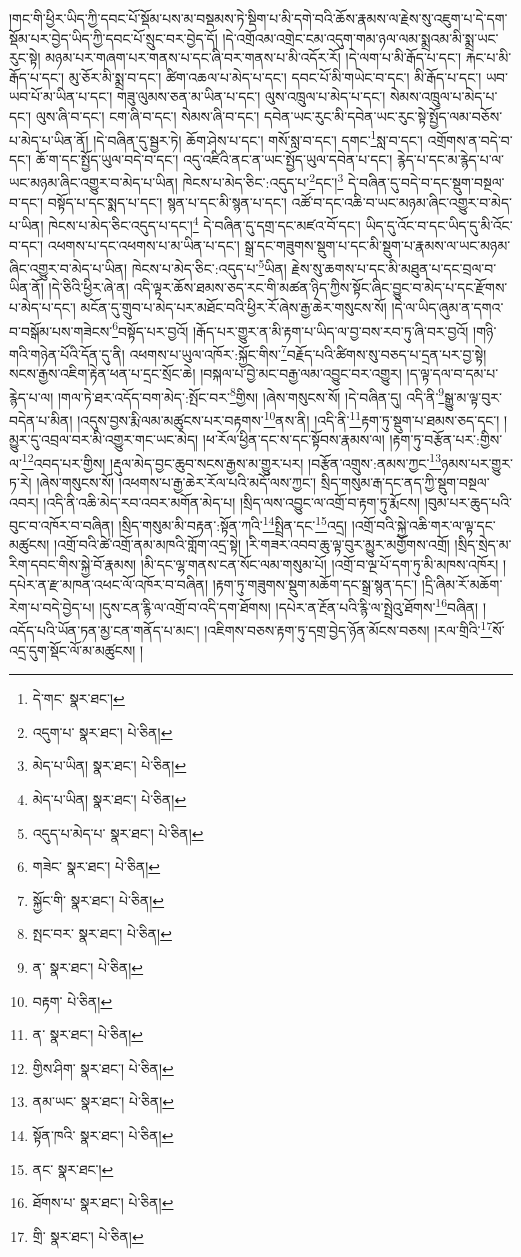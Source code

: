 །གང་གི་ཕྱིར་ཡིད་ཀྱི་དབང་པོ་སྡོམ་པས་མ་བསྡམས་ཏེ་སྡིག་པ་མི་དགེ་བའི་ཆོས་རྣམས་ལ་རྗེས་སུ་འཇུག་པ་དེ་དག་སྡོམ་པར་བྱེད་ཡིད་ཀྱི་དབང་པོ་སྲུང་བར་བྱེད་དོ། །དེ་འགྲོའམ་འགྲེང་ངམ་འདུག་གམ་ཉལ་ལམ་སྨྲའམ་མི་སྨྲ་ཡང་རུང་སྟེ། མཉམ་པར་གཞག་པར་གནས་པ་དང་ཞི་བར་གནས་པ་མི་འདོར་རོ། །དེ་ལག་པ་མི་རྒོད་པ་དང་། རྐང་པ་མི་རྒོད་པ་དང་། མུ་ཅོར་མི་སྨྲ་བ་དང་། ཚིག་འཆལ་པ་མེད་པ་དང་། དབང་པོ་མི་གཡེང་བ་དང་། མི་རྒོད་པ་དང་། ཡབ་ཡབ་པོ་མ་ཡིན་པ་དང་། གཟུ་ལུམས་ཅན་མ་ཡིན་པ་དང་། ལུས་འཁྲུལ་པ་མེད་པ་དང་། སེམས་འཁྲུལ་པ་མེད་པ་དང་། ལུས་ཞི་བ་དང་། ངག་ཞི་བ་དང་། སེམས་ཞི་བ་དང་། དབེན་ཡང་རུང་མི་དབེན་ཡང་རུང་སྟེ་སྤྱོད་ལམ་བཅོས་པ་མེད་པ་ཡིན་ནོ། །དེ་བཞིན་དུ་སྦྱར་ཏེ། ཆོག་ཤེས་པ་དང་། གསོ་སླ་བ་དང་། དགང་\footnote{དེ་གང་  སྣར་ཐང་། }སླ་བ་དང་། འགྲོགས་ན་བདེ་བ་དང་། ཆོ་ག་དང་སྤྱོད་ཡུལ་བདེ་བ་དང་། འདུ་འཛིའི་ནང་ན་ཡང་སྤྱོད་ཡུལ་དབེན་པ་དང་། རྙེད་པ་དང་མ་རྙེད་པ་ལ་ཡང་མཉམ་ཞིང་འགྱུར་བ་མེད་པ་ཡིན། ཁེངས་པ་མེད་ཅིང་:འདུད་པ་\footnote{འདུག་པ་  སྣར་ཐང་།  པེ་ཅིན། }དང་།\footnote{མེད་པ་ཡིན།  སྣར་ཐང་།  པེ་ཅིན། } དེ་བཞིན་དུ་བདེ་བ་དང་སྡུག་བསྔལ་བ་དང་། བསྟོད་པ་དང་སྨད་པ་དང་། སྙན་པ་དང་མི་སྙན་པ་དང་། འཚོ་བ་དང་འཆི་བ་ཡང་མཉམ་ཞིང་འགྱུར་བ་མེད་པ་ཡིན། ཁེངས་པ་མེད་ཅིང་འདུད་པ་དང་།\footnote{མེད་པ་ཡིན།  སྣར་ཐང་།  པེ་ཅིན། } དེ་བཞིན་དུ་དགྲ་དང་མཛའ་བོ་དང་། ཡིད་དུ་འོང་བ་དང་ཡིད་དུ་མི་འོང་བ་དང་། འཕགས་པ་དང་འཕགས་པ་མ་ཡིན་པ་དང་། སྒྲ་དང་གཟུགས་སྡུག་པ་དང་མི་སྡུག་པ་རྣམས་ལ་ཡང་མཉམ་ཞིང་འགྱུར་བ་མེད་པ་ཡིན། ཁེངས་པ་མེད་ཅིང་:འདུད་པ་\footnote{འདུད་པ་མེད་པ་  སྣར་ཐང་།  པེ་ཅིན། }ཡིན། རྗེས་སུ་ཆགས་པ་དང་མི་མཐུན་པ་དང་བྲལ་བ་ཡིན་ནོ། །དེ་ཅིའི་ཕྱིར་ཞེ་ན། འདི་ལྟར་ཆོས་ཐམས་ཅད་རང་གི་མཚན་ཉིད་ཀྱིས་སྟོང་ཞིང་བྱུང་བ་མེད་པ་དང་རྫོགས་པ་མེད་པ་དང་། མངོན་དུ་གྲུབ་པ་མེད་པར་མཐོང་བའི་ཕྱིར་རོ་ཞེས་རྒྱ་ཆེར་གསུངས་སོ། །དེ་ལ་ཡིད་ཞུམ་ན་དགའ་བ་བསྒོམ་པས་གཟེངས་\footnote{གཟེང་  སྣར་ཐང་།  པེ་ཅིན། }བསྟོད་པར་བྱའོ། །རྒོད་པར་གྱུར་ན་མི་རྟག་པ་ཡིད་ལ་བྱ་བས་རབ་ཏུ་ཞི་བར་བྱའོ། །གཉི་གའི་གཉེན་པོའི་དོན་དུ་ནི། འཕགས་པ་ཡུལ་འཁོར་:སྐྱོང་གིས་\footnote{སྐྱོང་གི་  སྣར་ཐང་།  པེ་ཅིན། }བརྗོད་པའི་ཚིགས་སུ་བཅད་པ་དྲན་པར་བྱ་སྟེ། སངས་རྒྱས་འཇིག་རྟེན་ཕན་པ་དྲང་སྲོང་ཆེ། །བསྐལ་པ་བྱེ་མང་བརྒྱ་ལམ་འབྱུང་བར་འགྱུར། །ད་ལྟ་དལ་བ་དམ་པ་རྙེད་པ་ལ། །གལ་ཏེ་ཐར་འདོད་བག་མེད་:སྤོང་བར་\footnote{སྤང་བར་  སྣར་ཐང་།  པེ་ཅིན། }གྱིས། །ཞེས་གསུངས་སོ། །དེ་བཞིན་དུ། འདི་ནི་\footnote{ན་  སྣར་ཐང་།  པེ་ཅིན། }སྒྱུ་མ་ལྟ་བུར་བདེན་པ་མིན། །འདུས་བྱས་རྨི་ལམ་མཚུངས་པར་བརྟགས་\footnote{བརྟག་  པེ་ཅིན། }ནས་ནི། །འདི་ནི་\footnote{ན་  སྣར་ཐང་།  པེ་ཅིན། }རྟག་ཏུ་སྡུག་པ་ཐམས་ཅད་དང་། །མྱུར་དུ་འབྲལ་བར་མི་འགྱུར་གང་ཡང་མེད། །ཕ་རོལ་ཕྱིན་དང་ས་དང་སྟོབས་རྣམས་ལ། །རྟག་ཏུ་བརྩོན་པར་:གྱིས་ལ་\footnote{གྱིས་ཤིག་  སྣར་ཐང་།  པེ་ཅིན། }འབད་པར་གྱིས། །རྡུལ་མེད་བྱང་ཆུབ་སངས་རྒྱས་མ་གྱུར་པར། །བརྩོན་འགྲུས་:ནམས་ཀྱང་\footnote{ནམ་ཡང་  སྣར་ཐང་།  པེ་ཅིན། }ཉམས་པར་གྱུར་ཏ་རེ། །ཞེས་གསུངས་སོ། །འཕགས་པ་རྒྱ་ཆེར་རོལ་པའི་མདོ་ལས་ཀྱང་། སྲིད་གསུམ་རྒ་དང་ནད་ཀྱི་སྡུག་བསྔལ་འབར། །འདི་ནི་འཆི་མེད་རབ་འབར་མགོན་མེད་པ། །སྲིད་ལས་འབྱུང་ལ་འགྲོ་བ་རྟག་ཏུ་རྨོངས། །བུམ་པར་ཆུད་པའི་བུང་བ་འཁོར་བ་བཞིན། །སྲིད་གསུམ་མི་བརྟན་:སྟོན་ཀའི་\footnote{སྟོན་ཁའི་  སྣར་ཐང་།  པེ་ཅིན། }སྤྲིན་དང་\footnote{ནང་  སྣར་ཐང་། }འདྲ། །འགྲོ་བའི་སྐྱེ་འཆི་གར་ལ་ལྟ་དང་མཚུངས། །འགྲོ་བའི་ཚེ་འགྲོ་ནམ་མཁའི་གློག་འདྲ་སྟེ། །རི་གཟར་འབབ་ཆུ་ལྟ་བུར་མྱུར་མགྱོགས་འགྲོ། །སྲིད་སྲེད་མ་རིག་དབང་གིས་སྐྱེ་བོ་རྣམས། །མི་དང་ལྷ་གནས་ངན་སོང་ལམ་གསུམ་པོ། །འགྲོ་བ་ལྔ་པོ་དག་ཏུ་མི་མཁས་འཁོར། །དཔེར་ན་རྫ་མཁན་འཕང་ལོ་འཁོར་བ་བཞིན། །རྟག་ཏུ་གཟུགས་སྡུག་མཆོག་དང་སྒྲ་སྙན་དང་། །དྲི་ཞིམ་རོ་མཆོག་རེག་པ་བདེ་བྱེད་པ། །དུས་ངན་རྙི་ལ་འགྲོ་བ་འདི་དག་ཐོགས། །དཔེར་ན་རྔོན་པའི་རྙི་ལ་སྤྲེའུ་ཐོགས་\footnote{ཐོགས་པ་  སྣར་ཐང་།  པེ་ཅིན། }བཞིན། །འདོད་པའི་ཡོན་ཏན་མྱ་ངན་གནོད་པ་མང་། །འཇིགས་བཅས་རྟག་ཏུ་དགྲ་བྱེད་ཉོན་མོངས་བཅས། །རལ་གྲིའི་\footnote{གྲི་  སྣར་ཐང་།  པེ་ཅིན། }སོ་འདྲ་དུག་སྡོང་ལོ་མ་མཚུངས། །
